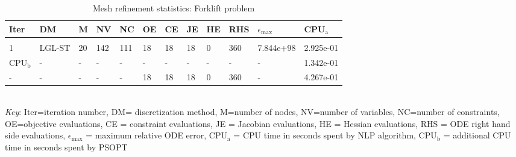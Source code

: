 
\begin{table}
\caption{Mesh refinement statistics: Forklift problem}
\label{mesh_stats_forklift}
\renewcommand{\tabcolsep}{0.15cm}
\tiny
\begin{tabular}{llllllllllll}
Iter&DM&M&NV&NC&OE&CE&JE&HE&RHS&$\epsilon_{\max}$&CPU$_\mathrm{a}$ \\ \hline \\
1&LGL-ST&20&142&111&18&18&18&0&360&7.844e+98&2.925e-01\\
\hline
CPU$_\mathrm{b}$ &-&-&-&-&-&-&-&-&-&-&1.342e-01\\
-&-&-&-&-&18&18&18&0&360&-&4.267e-01\\
\end{tabular}
\newline \\ \emph{Key}: Iter=iteration number, DM= discretization method, M=number of nodes, NV=number of variables, NC=number of constraints, OE=objective evaluations,  	              CE = constraint evaluations, JE = Jacobian evaluations, HE = Hessian evaluations, RHS = ODE right hand side 		      evaluations, $\epsilon_{\max}$ = maximum relative ODE error, CPU$_\mathrm{a}$ = CPU time in seconds spent by NLP algorithm, 		      CPU$_\mathrm{b}$ = additional CPU time in seconds spent by PSOPT
\normalsize
\end{table}